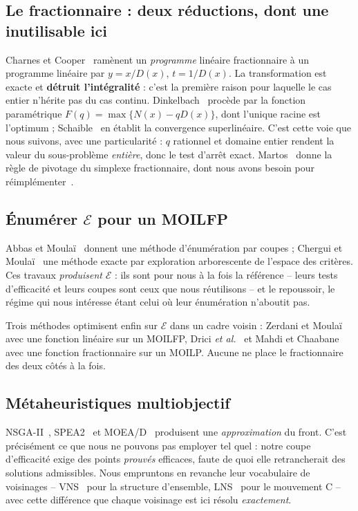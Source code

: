 \documentclass[11pt,a4paper]{article}
\theoremstyle{plain}
\theoremstyle{remark}
\newcommand{\Ecal}{\mathcal{E}}
\begin{document}
\subsection{Le fractionnaire : deux réductions, dont une inutilisable ici}

Charnes et Cooper~\cite{charnes1962} ramènent un \emph{programme} linéaire
fractionnaire à un programme linéaire par $y=x/D(x)$, $t=1/D(x)$. La
transformation est exacte et \textbf{détruit l'intégralité} : c'est la
première raison pour laquelle le cas entier n'hérite pas du cas continu.
Dinkelbach~\cite{dinkelbach1967} procède par la fonction paramétrique
$F(q)=\max\{N(x)-qD(x)\}$, dont l'unique racine est l'optimum ;
Schaible~\cite{schaible1976} en établit la convergence superlinéaire.
C'est cette voie que nous suivons, avec une particularité : $q$ rationnel
et domaine entier rendent la valeur du sous-problème \emph{entière}, donc
le test d'arrêt exact. Martos~\cite{martos1964,martos1975} donne la règle
de pivotage du simplexe fractionnaire, dont nous avons besoin pour
réimplémenter~\cite{zerdani2011}.

\subsection{Énumérer \texorpdfstring{$\Ecal$}{E} pour un MOILFP}

Abbas et Moulaï~\cite{abbas2002} donnent une méthode d'énumération par
coupes ; Chergui et Moulaï~\cite{chergui2008} une méthode exacte par
exploration arborescente de l'espace des critères. Ces travaux
\emph{produisent} $\Ecal$ : ils sont pour nous à la fois la référence --
leurs tests d'efficacité et leurs coupes sont ceux que nous réutilisons --
et le repoussoir, le régime qui nous intéresse étant celui où leur
énumération n'aboutit pas.

Trois méthodes optimisent enfin sur $\Ecal$ dans un cadre voisin :
Zerdani et Moulaï~\cite{zerdani2011} avec une fonction linéaire sur un
MOILFP, Drici \emph{et al.}~\cite{drici2018} et Mahdi et
Chaabane~\cite{mahdi2015} avec une fonction fractionnaire sur un MOILP.
Aucune ne place le fractionnaire des deux côtés à la fois.

\subsection{Métaheuristiques multiobjectif}

NSGA-II~\cite{deb2002}, SPEA2~\cite{zitzler2001} et MOEA/D~\cite{zhang2007}
produisent une \emph{approximation} du front. C'est précisément ce que nous
ne pouvons pas employer tel quel : notre coupe d'efficacité exige des
points \emph{prouvés} efficaces, faute de quoi elle retrancherait des
solutions admissibles. Nous empruntons en revanche leur vocabulaire de
voisinages -- VNS~\cite{mladenovic1997} pour la structure d'ensemble,
LNS~\cite{shaw1998,pisinger2010} pour le mouvement C -- avec cette
différence que chaque voisinage est ici résolu \emph{exactement}.
\end{document}
